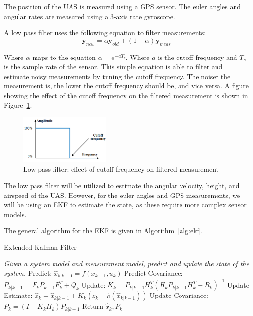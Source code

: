 The position of the UAS is measured using a GPS sensor. The euler angles and angular rates are measured using a 3-axis rate gyroscope.

A low pass filter uses the following equation to filter measurements:
\begin{equation}
    \mathbf{y}_{new} = \alpha \mathbf{y}_{old} + (1 - \alpha) \mathbf{y}_{meas}
    \label{eq:low_pass}
\end{equation}

Where $\alpha$ maps to the equation $\alpha = e^{-a T_s}$. Where $a$ is the cutoff frequency and $T_s$ is the sample rate of the sensor.
This simple equation is able to filter and estimate noisy measurements by tuning the cutoff frequency. The noiser the measurement is, the lower the cutoff frequency should be, and vice versa.
A figure showing the effect of the cutoff frequency on the filtered measurement is shown in Figure~\ref{fig:low_pass}.

\begin{figure}[h]  
    \centering
    \includegraphics[width=0.4\textwidth]{images/low_pass.png}
    \caption{Low pass filter: effect of cutoff frequency on filtered measurement}
    \label{fig:low_pass}
\end{figure}

The low pass filter will be utilized to estimate the angular velocity, height, and airspeed of the UAS.
However, for the euler angles and GPS measurements, we will be using an EKF to estimate the state, as these require more complex sensor models.

The general algorithm for the EKF is given in Algorithm~\ref{alg:ekf}.

\begin{algorithm}
    \caption{Extended Kalman Filter}\label{alg:ekf}
    \begin{algorithmic}
    \State \textit{Given a system model and measurement model, predict and update the state of the system.}
    \State Predict: $\hat{x}_{k|k-1} = f(x_{k-1}, u_k)$
    \State Predict Covariance: $P_{k|k-1} = F_k P_{k-1} F_k^T + Q_k$
    \State Update: $K_k = P_{k|k-1} H_k^T (H_k P_{k|k-1} H_k^T + R_k)^{-1}$
    \State Update Estimate: $\hat{x}_k = \hat{x}_{k|k-1} + K_k (z_k - h(\hat{x}_{k|k-1}))$
    \State Update Covariance: $P_k = (I - K_k H_k) P_{k|k-1}$
    \State Return $\hat{x}_k, P_k$
    \EndFunction
    \end{algorithmic}
\end{algorithm}

